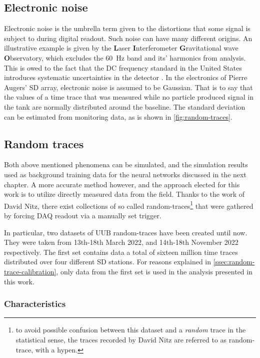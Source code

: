 \subsection{Electronic noise}
\label{ssec:electronic-noise}

Electronic noise is the umbrella term given to the distortions that some signal is subject to during digital readout. Such noise can have many different origins.
An illustrative example is given by the \textbf{L}aser \textbf{I}nterferometer \textbf{G}ravitational wave \textbf{O}bservatory, which excludes the \SI{60}{\hertz}
band and its' harmonics from analysis. This is owed to the fact that the DC frequency standard in the United States introduces systematic uncertainties in the
detector \cite{martynov2016sensitivity}. In the electronics of Pierre Augers' SD array, electronic noise is assumed to be Gaussian. That is to say that the 
\SI{}{\ADC} values of a time trace that was measured while no particle produced signal in the tank are normally distributed around the baseline. The standard 
deviation can be estimated from monitoring data, as is shown in \autoref{fig:random-traces}.

\subsection{Random traces}
\label{ssec:random-traces}

Both above mentioned phenomena can be simulated, and the simulation results used as background training data for the neural networks discussed in the next chapter.
A more accurate method however, and the approach elected for this work is to utilize directly measured data from the field. Thanks to the work of David Nitz, there 
exist collections of so called random-traces\footnote{to avoid possible confusion between this dataset and a \textit{random} trace in the statistical sense, the 
traces recorded by David Nitz are referred to as random-trace, with a hypen.} that were gathered by forcing DAQ readout via a manually set trigger. 

In particular, two datasets of UUB random-traces have been created until now. They were taken from 13th-18th March 2022, and 14th-18th November 2022 respectively. 
The first set contains data a total of sixteen million time traces distributed over four different SD stations. For reasons explained in 
\autoref{ssec:random-trace-calibration}, only data from the first set is used in the analysis presented in this work.

\subsubsection{Characteristics}
\label{ssec:random-trace-characteristics}

